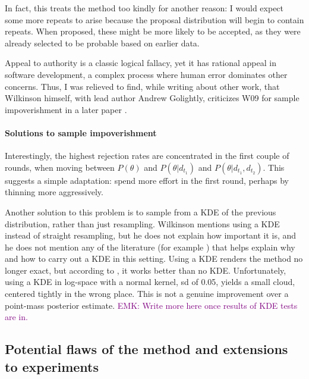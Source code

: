 \documentclass{article}
\newcommand\EMK[1]{\textcolor{purple}{EMK: #1}}
\begin{document}
In fact, this treats the method too kindly for another reason: I would expect some more repeats to arise because the proposal distribution will begin to contain repeats. When proposed, these might be more likely to be accepted, as they were already selected to be probable based on earlier data. 

Appeal to authority is a classic logical fallacy, yet it has rational appeal in software development, a complex process where human error dominates other concerns. Thus, I was relieved to find, while writing about other work, that Wilkinson himself, with lead author Andrew Golightly, criticizes W09 for sample impoverishment in a later paper \cite{golightly2011bayesian}. 

\paragraph{Solutions to sample impoverishment}
Interestingly, the highest rejection rates are concentrated in the first couple of rounds, when moving between $P(\theta)$ and $P(\theta|d_{t_1})$ and $P(\theta|d_{t_1}, d_{t_2})$. This suggests a simple adaptation: spend more effort in the first round, perhaps by thinning more aggressively.

Another solution to this problem is to sample from a KDE of the previous distribution, rather than just resampling. Wilkinson mentions using a KDE instead of straight resampling, but he does not explain how important it is, and he does not mention any of the literature (for example \cite{particle_filter_tutorial}) that helps explain why and how to carry out a KDE in this setting.  Using a KDE renders the method no longer exact, but according to \cite{particle_filter_tutorial}, it works better than no KDE. %
Unfortunately, using a KDE in log-space with a normal kernel, sd of 0.05, yields a small cloud, centered tightly in the wrong place. This is not a genuine improvement over a point-mass posterior estimate. \EMK{Write more here once results of KDE tests are in.}


\subsection{Potential flaws of the method and extensions to experiments}
\end{document}
